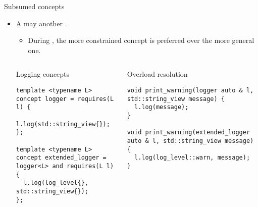 \begin{frame}[t,fragile]{Subsumed concepts}
\begin{itemize}
  \item A  may  another .
    \begin{itemize}
      \item During , the more constrained
            concept is preferred over the more general one.
    \end{itemize}

\begin{columns}[T]

\begin{block}{Logging concepts}
\begin{lstlisting}[basicstyle=\mode<presentation>{\tiny}]
template <typename L>
concept logger = requires(L l) {
  l.log(std::string_view{});
};

template <typename L>
concept extended_logger = logger<L> and requires(L l) {
  l.log(log_level{}, std::string_view{});
};
\end{lstlisting}
\end{block}

\begin{block}{Overload resolution}
\begin{lstlisting}[basicstyle=\mode<presentation>{\tiny}]
void print_warning(logger auto & l, std::string_view message) {
  l.log(message);
}

void print_warning(extended_logger auto & l, std::string_view message) {
  l.log(log_level::warn, message);
}
\end{lstlisting}
\end{block}

\end{columns}
\end{itemize}
\end{frame}
